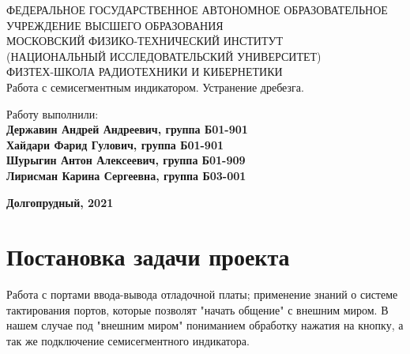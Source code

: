\documentclass[15pt,a5paper,reqno]{article}
\begin{document}
\begin{center}
  {\small ФЕДЕРАЛЬНОЕ ГОСУДАРСТВЕННОЕ АВТОНОМНОЕ ОБРАЗОВАТЕЛЬНОЕ\\ УЧРЕЖДЕНИЕ ВЫСШЕГО ОБРАЗОВАНИЯ\\ МОСКОВСКИЙ ФИЗИКО-ТЕХНИЧЕСКИЙ ИНСТИТУТ\\ (НАЦИОНАЛЬНЫЙ ИССЛЕДОВАТЕЛЬСКИЙ УНИВЕРСИТЕТ)\\ ФИЗТЕХ-ШКОЛА РАДИОТЕХНИКИ И КИБЕРНЕТИКИ}\\
  \hfill \break
  \hfill \break
  \hfill \break
  \Huge{Работа с семисегментным индикатором. Устранение дребезга.}\\
\end{center}

\hfill \break
\hfill \break
\hfill \break
\hfill \break
\hfill \break
\hfill \break

\begin{flushright}
  \normalsize{Работу выполнили:}\\
  \normalsize{\textbf{Державин Андрей Андреевич, группа Б01-901}}\\
  \normalsize{\textbf{Хайдари Фарид Гулович, группа Б01-901}}\\
  \normalsize{\textbf{Шурыгин Антон Алексеевич, группа Б01-909}}\\
  \normalsize{\textbf{Лирисман Карина Сергеевна, группа Б03-001}}
\end{flushright}

\begin{center}
  \normalsize{\textbf{Долгопрудный, 2021}}
\end{center}


\thispagestyle{empty} %


\newpage
\thispagestyle{plain}
\tableofcontents
\thispagestyle{plain}
\newpage



\section{Постановка задачи проекта}

Работа с портами ввода-вывода отладочной платы; применение знаний о системе тактирования портов, которые позволят "начать общение" с внешним миром. В нашем случае под "внешним миром" пониманием обработку нажатия на кнопку, а так же подключение семисегментного индикатора.
\end{document}
